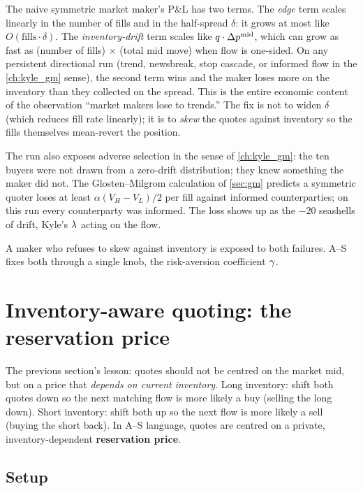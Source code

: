 \begin{pitfallbox}
The naive symmetric market maker's P\&L has two terms. The
\emph{edge} term scales linearly in the number of fills and in
the half-spread $\delta$: it grows at most like
$O(\text{fills} \cdot \delta)$. The \emph{inventory-drift} term
scales like $q \cdot \Delta p^{\mathrm{mid}}$, which can grow as fast as
(number of fills) $\times$ (total mid move) when flow is
one-sided. On any persistent directional run (trend,
newsbreak, stop cascade, or informed flow in the
\cref{ch:kyle_gm} sense), the second term wins and the maker
loses more on the inventory than they collected on the spread.
This is the entire economic content of the observation
``market makers lose to trends.'' The fix is not to widen
$\delta$ (which reduces fill rate linearly); it is to
\emph{skew} the quotes against inventory so the fills
themselves mean-revert the position.
\end{pitfallbox}

The run also exposes adverse selection in the sense of
\cref{ch:kyle_gm}: the ten buyers were not drawn from a zero-drift
distribution; they knew something the maker did not. The
Glosten--Milgrom calculation of \cref{sec:gm} predicts a symmetric
quoter loses at least $\alpha(V_H - V_L)/2$ per fill against informed
counterparties; on this run every counterparty was informed. The
loss shows up as the $-20$ seashells of drift, Kyle's $\lambda$ acting
on the flow.

A maker who refuses to skew against inventory is exposed to both
failures. A--S fixes both through a single knob, the risk-aversion
coefficient $\gamma$.

\section{Inventory-aware quoting: the reservation price}
\label{sec:ch8_reservation}

The previous section's lesson: quotes should not be centred on the
market mid, but on a price that \emph{depends on current inventory}.
Long inventory: shift both quotes down so the next matching flow is
more likely a buy (selling the long down). Short inventory: shift
both up so the next flow is more likely a sell (buying the short
back). In A--S language, quotes are centred on a private,
inventory-dependent \textbf{reservation price}.

\subsection{Setup}
\label{subsec:ch8_setup}

